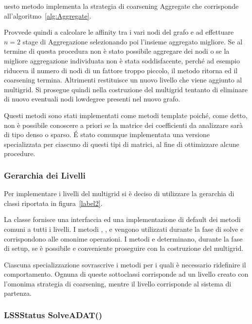 uesto metodo implementa la strategia di coarsening Aggregate che corrisponde all'algoritmo~\vref{alg:Aggregate}.

Provvede quindi a calcolare le affinity tra i vari nodi del grafo e ad effettuare $n=2$ stage di Aggregazione selezionando poi l'insieme aggregato migliore.
Se al termine di questa procedura non è stato possibile aggregare dei nodi o se la migliore aggregazione individuata non è stata soddisfacente, perché ad esempio riduceva il numero di nodi di un fattore troppo piccolo, il metodo ritorna  ed il coarsening termina.
Altrimenti restituisce un nuovo livello che viene aggiunto al multigrid. Si prosegue quindi nella costruzione del multigrid tentanto di eliminare di nuovo eventuali nodi lowdegree presenti nel nuovo grafo.

Questi metodi sono stati implementati come metodi template poiché, come detto, non è possibile conoscere a priori se la matrice dei coefficienti da analizzare sarà di tipo denso o sparso.
É stato comunque implementata una versione specializzata per ciascuno di questi tipi di matrici, al fine di ottimizzare alcune procedure.

\subsubsection{Gerarchia dei Livelli}

Per implementare i livelli del multigrid si è deciso di utilizzare la gerarchia di classi riportata in figura~\vref{label2}.


La classe  fornisce una interfaccia ed una implementazione di default dei metodi comuni a tutti i livelli.
I metodi , ,  e  vengono utilizzati durante la fase di solve e corrispondono alle omonime operazioni.
I metodi  e  determinano, durante la fase di setup, se è possibile e conveniente proseguire con la costruzione del multigrid.

Ciascuna specializzazione sovrascrive i metodi per i quali è necessario ridefinire il comportamento. Ognuna di queste sottoclassi corrisponde ad un livello creato con l'omonima strategia di coarsening, mentre il livello  corrisponde al sistema di partenza.

\subsubsection{LSSStatus SolveADAT()}

